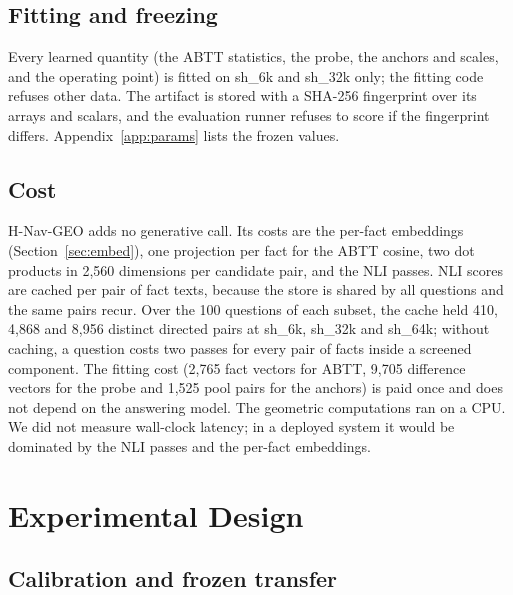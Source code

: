 \documentclass[11pt]{article}
\newcommand{\sub}[1]{\textsf{sh\_#1}}                    %
\newcommand{\geo}{H-Nav-GEO}
\begin{document}
\subsection{Fitting and freezing}
\label{sec:freeze}

Every learned quantity (the ABTT statistics, the probe, the anchors and scales, and the operating point) is fitted on \sub{6k} and \sub{32k} only; the fitting code refuses other data. The artifact is stored with a SHA-256 fingerprint over its arrays and scalars, and the evaluation runner refuses to score if the fingerprint differs. Appendix~\ref{app:params} lists the frozen values.

\subsection{Cost}
\label{sec:costmethod}

\geo{} adds no generative call. Its costs are the per-fact embeddings (Section~\ref{sec:embed}), one projection per fact for the ABTT cosine, two dot products in 2,560 dimensions per candidate pair, and the NLI passes. NLI scores are cached per pair of fact texts, because the store is shared by all questions and the same pairs recur. Over the 100 questions of each subset, the cache held 410, 4,868 and 8,956 distinct directed pairs at \sub{6k}, \sub{32k} and \sub{64k}; without caching, a question costs two passes for every pair of facts inside a screened component. The fitting cost (2,765 fact vectors for ABTT, 9,705 difference vectors for the probe and 1,525 pool pairs for the anchors) is paid once and does not depend on the answering model. The geometric computations ran on a CPU. We did not measure wall-clock latency; in a deployed system it would be dominated by the NLI passes and the per-fact embeddings.

\section{Experimental Design}
\label{sec:design}

\subsection{Calibration and frozen transfer}
\label{sec:splits}
\end{document}
